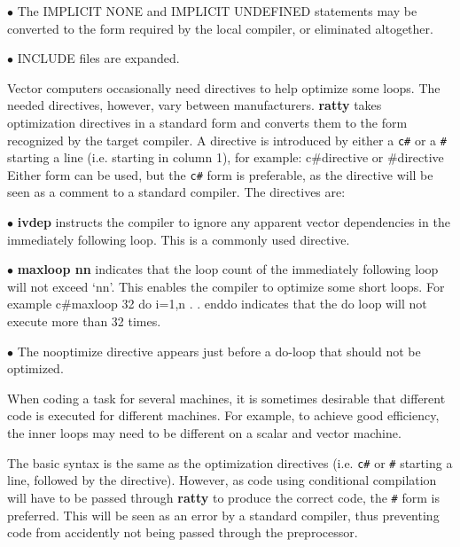 \item{$\bullet$} The IMPLICIT NONE and IMPLICIT UNDEFINED statements
may be converted to the form required by the local compiler, or
eliminated altogether.

\item{$\bullet$} INCLUDE files are expanded.


Vector computers occasionally need
directives to help optimize some loops. The needed directives, however,
vary between manufacturers. {\bf ratty} takes optimization directives
in a standard form and converts them to the form recognized by the
target compiler. A directive is introduced by either a {\tt c\#} or a
{\tt \#} starting a line (i.e. starting in column 1), for example:
{\ninepoint\begintt
  c#directive
\endtt}
or
{\ninepoint\begintt
  #directive
\endtt}
Either form can be used, but the {\tt c\#} form is preferable, as the
directive will be seen as a comment to a standard compiler. The
directives are:

\item{$\bullet$} {\bf ivdep} instructs the compiler to ignore any apparent
vector dependencies in the immediately following loop.  This is a commonly
used directive.

\item{$\bullet$} {\bf maxloop nn} indicates that the loop count of
the immediately following loop will not exceed `nn'. This enables the
compiler to optimize some short loops. For example
{\ninepoint\begintt
  c#maxloop 32
      do i=1,n
         .
         .
      enddo
\endtt}
indicates that the do loop will not execute more than 32 times.

\item{$\bullet$} The {nooptimize} directive appears just before a
do-loop that should not be optimized.


When coding a task for
several machines, it is sometimes desirable that different code is
executed for different machines. For example, to achieve good
efficiency, the inner loops may need to be different on a scalar
and vector machine.

The basic syntax is the same as the optimization directives (i.e.
{\tt c\#} or {\tt \#} starting a line, followed by the directive). However,
as code using conditional compilation will have to be passed through
{\bf ratty} to produce the correct code, the {\tt \#} form is preferred.
This will be seen as an error by a standard compiler, thus preventing
code from accidently not being passed through the preprocessor.

